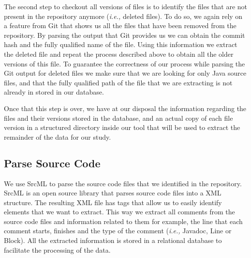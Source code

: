 The second step to checkout all versions of files is to identify the files that are not present in the repository anymore (\textit{i.e.,} deleted files). To do so, we again rely on a feature from Git that shows us all the files that have been removed from the repository. By parsing the output that Git provides us we can obtain the commit hash and the fully qualified name of the file. Using this information we extract the deleted file and repeat the process described above to obtain all the older versions of this file. To guarantee the correctness of our process while parsing the Git output for deleted files we make sure that we are looking for only Java source files, and that the fully qualified path of the file that we are extracting is not already in stored in our database. 

Once that this step is over, we have at our disposal the information regarding the files and their versions stored in the database, and an actual copy of each file version in a structured directory inside our tool that will be used to extract the remainder of the data for our study.

\subsection{Parse Source Code}
\label{sub:parse_source_code}

We use SrcML \cite{Collard2013SIE} to parse the source code files that we identified in the repository. SrcML is an open source library that parses source code files into a XML structure. The resulting XML file has tags that allow us to easily identify elements that we want to extract. This way we extract all comments from the source code files and information related to them for example, the line that each comment starts, finishes and the type of the comment (\textit{i.e.,} Javadoc, Line or Block). All the extracted information is stored in a relational database to facilitate the processing of the data. 


